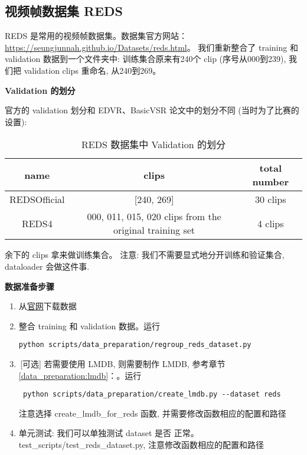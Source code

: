 \documentclass[../main.tex]{subfiles}
\begin{document}
\subsection{视频帧数据集 REDS}

REDS 是常用的视频帧数据集。数据集官方网站：\url{https://seungjunnah.github.io/Datasets/reds.html}。
我们重新整合了 training 和 validation 数据到一个文件夹中: 训练集合原来有240个 clip (序号从000到239), 我们把 validation clips 重命名, 从240到269。

\noindent\textbf{Validation 的划分}

官方的 validation 划分和 EDVR、BasicVSR 论文中的划分不同 (当时为了比赛的设置):

\begin{table}[h]
    \centering
    \begin{tabular}{|c|c|c|}
        \hline
        \textbf{name} & \textbf{clips}                                          & \textbf{total number} \\ \hline
        REDSOfficial  & [240, 269]                                              & 30 clips              \\ \hline
        REDS4         & 000, 011, 015, 020 clips from the original training set & 4 clips               \\ \hline
    \end{tabular}
    \caption{REDS 数据集中 Validation 的划分}
\end{table}
余下的 clips 拿来做训练集合。 注意: 我们不需要显式地分开训练和验证集合, dataloader 会做这件事.

\noindent\textbf{数据准备步骤}

\begin{enumerate}
    \item 从\href{https://seungjunnah.github.io/Datasets/reds.html}{官网}下载数据
    \item 整合 training 和 validation 数据。运行
    \begin{verbatim}
python scripts/data_preparation/regroup_reds_dataset.py
\end{verbatim}
    \item\,[可选] 若需要使用 LMDB, 则需要制作 LMDB, 参考章节\ref{data_preparation:lmdb}：。运行
    \begin{verbatim}
 python scripts/data_preparation/create_lmdb.py --dataset reds
\end{verbatim}
    注意选择 create\_lmdb\_for\_reds 函数, 并需要修改函数相应的配置和路径
    \item 单元测试: 我们可以单独测试 dataset 是否 正常。test\_scripts/test\_reds\_dataset.py, 注意修改函数相应的配置和路径
\end{enumerate}
\end{document}
